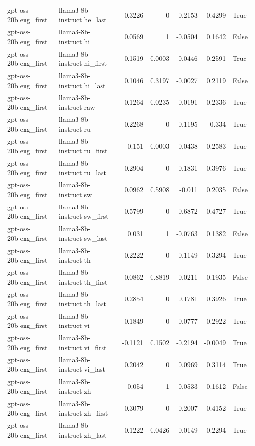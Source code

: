 \begin{table}
\begin{tabular}{l l r r r r l}
gpt-oss-20b|eng_first & llama3-8b-instruct|he_last & 0.3226 & 0 & 0.2153 & 0.4299 & True \\
gpt-oss-20b|eng_first & llama3-8b-instruct|hi & 0.0569 & 1 & -0.0504 & 0.1642 & False \\
gpt-oss-20b|eng_first & llama3-8b-instruct|hi_first & 0.1519 & 0.0003 & 0.0446 & 0.2591 & True \\
gpt-oss-20b|eng_first & llama3-8b-instruct|hi_last & 0.1046 & 0.3197 & -0.0027 & 0.2119 & False \\
gpt-oss-20b|eng_first & llama3-8b-instruct|raw & 0.1264 & 0.0235 & 0.0191 & 0.2336 & True \\
gpt-oss-20b|eng_first & llama3-8b-instruct|ru & 0.2268 & 0 & 0.1195 & 0.334 & True \\
gpt-oss-20b|eng_first & llama3-8b-instruct|ru_first & 0.151 & 0.0003 & 0.0438 & 0.2583 & True \\
gpt-oss-20b|eng_first & llama3-8b-instruct|ru_last & 0.2904 & 0 & 0.1831 & 0.3976 & True \\
gpt-oss-20b|eng_first & llama3-8b-instruct|sw & 0.0962 & 0.5908 & -0.011 & 0.2035 & False \\
gpt-oss-20b|eng_first & llama3-8b-instruct|sw_first & -0.5799 & 0 & -0.6872 & -0.4727 & True \\
gpt-oss-20b|eng_first & llama3-8b-instruct|sw_last & 0.031 & 1 & -0.0763 & 0.1382 & False \\
gpt-oss-20b|eng_first & llama3-8b-instruct|th & 0.2222 & 0 & 0.1149 & 0.3294 & True \\
gpt-oss-20b|eng_first & llama3-8b-instruct|th_first & 0.0862 & 0.8819 & -0.0211 & 0.1935 & False \\
gpt-oss-20b|eng_first & llama3-8b-instruct|th_last & 0.2854 & 0 & 0.1781 & 0.3926 & True \\
gpt-oss-20b|eng_first & llama3-8b-instruct|vi & 0.1849 & 0 & 0.0777 & 0.2922 & True \\
gpt-oss-20b|eng_first & llama3-8b-instruct|vi_first & -0.1121 & 0.1502 & -0.2194 & -0.0049 & True \\
gpt-oss-20b|eng_first & llama3-8b-instruct|vi_last & 0.2042 & 0 & 0.0969 & 0.3114 & True \\
gpt-oss-20b|eng_first & llama3-8b-instruct|zh & 0.054 & 1 & -0.0533 & 0.1612 & False \\
gpt-oss-20b|eng_first & llama3-8b-instruct|zh_first & 0.3079 & 0 & 0.2007 & 0.4152 & True \\
gpt-oss-20b|eng_first & llama3-8b-instruct|zh_last & 0.1222 & 0.0426 & 0.0149 & 0.2294 & True \\

\end{tabular}
\end{table}
